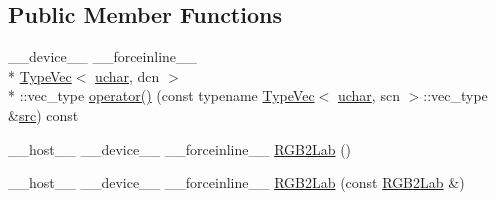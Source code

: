 \subsection*{Public Member Functions}
\begin{DoxyCompactItemize}
\item 
\-\_\-\-\_\-device\-\_\-\-\_\- \-\_\-\-\_\-forceinline\-\_\-\-\_\- \\*
\hyperlink{structcv_1_1gpu_1_1device_1_1TypeVec}{Type\-Vec}$<$ \hyperlink{core_2types__c_8h_a65f85814a8290f9797005d3b28e7e5fc}{uchar}, dcn $>$\\*
\-::vec\-\_\-type \hyperlink{structcv_1_1gpu_1_1device_1_1color__detail_1_1RGB2Lab_3_01uchar_00_01scn_00_01dcn_00_01srgb_00_01blueIdx_01_4_a8a6da2eca58a7971f870a640ed76f397}{operator()} (const typename \hyperlink{structcv_1_1gpu_1_1device_1_1TypeVec}{Type\-Vec}$<$ \hyperlink{core_2types__c_8h_a65f85814a8290f9797005d3b28e7e5fc}{uchar}, scn $>$\-::vec\-\_\-type \&\hyperlink{legacy_8hpp_a371cd109b74033bc4366f584edd3dacc}{src}) const 
\item 
\-\_\-\-\_\-host\-\_\-\-\_\- \-\_\-\-\_\-device\-\_\-\-\_\- \-\_\-\-\_\-forceinline\-\_\-\-\_\- \hyperlink{structcv_1_1gpu_1_1device_1_1color__detail_1_1RGB2Lab_3_01uchar_00_01scn_00_01dcn_00_01srgb_00_01blueIdx_01_4_a498fd62a895b3bb0051cb764d68adebf}{R\-G\-B2\-Lab} ()
\item 
\-\_\-\-\_\-host\-\_\-\-\_\- \-\_\-\-\_\-device\-\_\-\-\_\- \-\_\-\-\_\-forceinline\-\_\-\-\_\- \hyperlink{structcv_1_1gpu_1_1device_1_1color__detail_1_1RGB2Lab_3_01uchar_00_01scn_00_01dcn_00_01srgb_00_01blueIdx_01_4_a46914c3c4801568f256604ab20017ae5}{R\-G\-B2\-Lab} (const \hyperlink{structcv_1_1gpu_1_1device_1_1color__detail_1_1RGB2Lab}{R\-G\-B2\-Lab} \&)
\end{DoxyCompactItemize}


